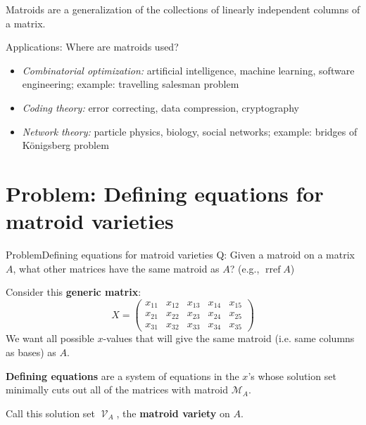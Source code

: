 \documentclass[%
	12pt]{beamer}
\theoremstyle{plain}
\theoremstyle{definition}
\DeclareMathOperator{\Var}{\mathcal V}
\DeclareMathOperator{\rref}{rref}
\begin{document}
\begin{frame}{}{}
{\color{powCol}
Matroids are a generalization of the collections of linearly independent columns of a matrix.
}

\pause
\vspace{1pc}
{\color{powCol}Applications:} Where are matroids used? \pause
\begin{itemize}
\item \emph{Combinatorial optimization:} artificial intelligence, machine learning, software engineering; example: travelling salesman problem \pause
\item \emph{Coding theory:} error correcting, data compression, cryptography \pause
\item \emph{Network theory:} particle physics, biology, social networks; example: bridges of K\"onigsberg problem
\end{itemize}
\end{frame}


\section{Problem: Defining equations for matroid varieties}
	
\begin{frame}{Problem}{Defining equations for matroid varieties}
{\color{powCol}Q:} Given a matroid on a matrix $A$, what other matrices have the same matroid as $A$? (e.g., $\rref A$)  

\pause
\vspace{1pc}
Consider this \textbf{generic matrix}:
\[
X=\begin{pmatrix}
x_{11} & x_{12} & x_{13} & x_{14} & x_{15} \\
x_{21} & x_{22} & x_{23} & x_{24} & x_{25} \\
x_{31} & x_{32} & x_{33} & x_{34} & x_{35}
\end{pmatrix}
\]
We want all possible $x$-values that will give the same matroid (i.e. same columns as bases) as $A$.  
\end{frame}

\begin{frame}{}{}
\textbf{Defining equations} are a system of equations in the $x$'s whose solution set minimally cuts out all of the matrices with matroid $\mathscr M_A$.  

\pause
\vspace{1pc}
Call this solution set $\Var_A$, the \textbf{matroid variety} on $A$.
\end{frame}
\end{document}
